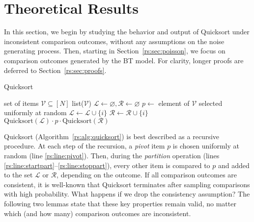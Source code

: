 \section{Theoretical Results}  %
\label{rs:sec:theory}

In this section, we begin by studying the behavior and output of Quicksort under inconsistent comparison outcomes, without any assumptions on the noise generating process.
Then, starting in Section~\ref{rs:sec:poisson}, we focus on comparison outcomes generated by the BT model.
For clarity, longer proofs are deferred to Section~\ref{rs:sec:proofs}.

\begin{algorithm}[t]
   \caption{Quicksort}
   \label{rs:alg:quicksort}
\begin{algorithmic}[1]
   \Require set of items $\mathcal{V} \subseteq [N]$
    \Return list($\mathcal{V}$)
   \State $\mathcal{L} \gets \varnothing, \mathcal{R} \gets \varnothing$
   \State $p \gets $ element of $\mathcal{V}$ selected uniformly at random \label{rs:line:pivot}
    \label{rs:line:startpart}
      \label{rs:line:comp}
       \State $\mathcal{L} \gets \mathcal{L} \cup \{i\}$
     \Else
       \State $\mathcal{R} \gets \mathcal{R} \cup \{i\}$
     \EndIf
   \EndFor  \label{rs:line:stoppart}
   \State \Return $\text{Quicksort}(\mathcal{L}) \cdot p \cdot \text{Quicksort}(\mathcal{R})$ \label{rs:line:return}
\end{algorithmic}
\end{algorithm}

Quicksort (Algorithm~\ref{rs:alg:quicksort}) is best described as a recursive procedure.
At each step of the recursion, a \emph{pivot} item $p$ is chosen uniformly at random (line \ref{rs:line:pivot}).
Then, during the \emph{partition} operation (lines \ref{rs:line:startpart}--\ref{rs:line:stoppart}), every other item is compared to $p$ and added to the set $\mathcal{L}$ or $\mathcal{R}$, depending on the outcome.
If all comparison outcomes are consistent, it is well-known that Quicksort terminates after sampling  comparisons with high probability.
What happens if we drop the consistency assumption?
The following two lemmas state that these key properties remain valid, no matter which (and how many) comparison outcomes are inconsistent.

